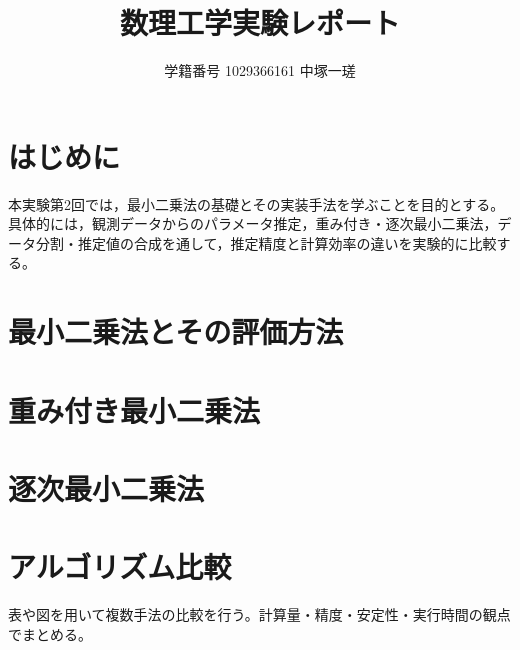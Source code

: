 \documentclass[a4paper,11pt]{ltjsarticle}
\title{数理工学実験レポート\\[4pt]\large \ChapterTitle}
\author{学籍番号 1029366161 \quad 中塚一瑳}
\date{\ExperimentDate}
\newcommand{\R}{\mathbb{R}}
\begin{document}
\maketitle
\begin{abstract}
\end{abstract}

\tableofcontents
\clearpage


\section{はじめに}
本実験第2回では，最小二乗法の基礎とその実装手法を学ぶことを目的とする。具体的には，観測データからのパラメータ推定，重み付き・逐次最小二乗法，データ分割・推定値の合成を通して，推定精度と計算効率の違いを実験的に比較する。


\section{最小二乗法とその評価方法}



\section{重み付き最小二乗法}



\section{逐次最小二乗法}

% 



\section{アルゴリズム比較}
表や図を用いて複数手法の比較を行う。計算量・精度・安定性・実行時間の観点でまとめる。
\end{document}
